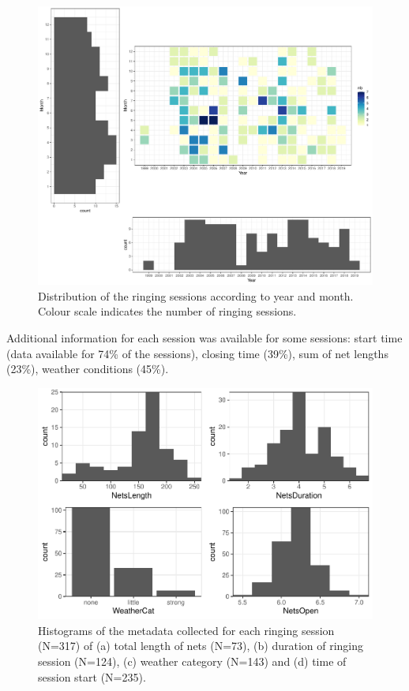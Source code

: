 \documentclass[]{interact}
\theoremstyle{plain}%
\theoremstyle{definition}
\theoremstyle{remark}
\begin{document}
\begin{figure}
\centering
\includegraphics{manuscript_files/figure-latex/unnamed-chunk-8-1.pdf}
\caption{Distribution of the ringing sessions according to year and
month. Colour scale indicates the number of ringing sessions.}
\end{figure}

Additional information for each session was available for some sessions:
start time (data available for 74\% of the sessions), closing time
(39\%), sum of net lengths (23\%), weather conditions (45\%).

\begin{figure}
\centering
\includegraphics{manuscript_files/figure-latex/unnamed-chunk-9-1.pdf}
\caption{Histograms of the metadata collected for each ringing session
(N=317) of (a) total length of nets (N=73), (b) duration of ringing
session (N=124), (c) weather category (N=143) and (d) time of session
start (N=235).}
\end{figure}
\end{document}
